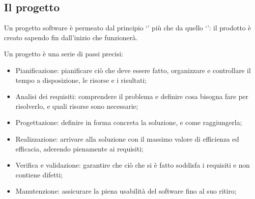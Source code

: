 \subsection{Il progetto}
Un progetto software è permeato dal principio `' più che da quello `': il prodotto è creato sapendo fin dall'inizio che funzionerà.

Un progetto è una serie di passi precisi:
\begin{itemize}
	\item Pianificazione: pianificare ciò che deve essere fatto, organizzare e controllare il tempo a disposizione, le risorse e i risultati;
	\item Analisi dei requisiti: comprendere il problema e definire cosa bisogna fare per risolverlo, e quali risorse sono necessarie;
	\item Progettazione: definire in forma concreta la soluzione, e come raggiungerla;
	\item Realizzazione: arrivare alla soluzione con il massimo valore di efficienza ed efficacia, aderendo pienamente ai requisiti;
	\item Verifica e validazione: garantire che ciò che si è fatto soddisfa i requisiti e non contiene difetti;
	\item Manutenzione: assicurare la piena usabilità del software fino al suo ritiro;
\end{itemize}


